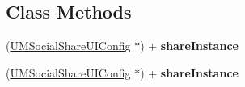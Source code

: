 \subsection*{Class Methods}
\begin{DoxyCompactItemize}
\item 
\mbox{\label{interface_u_m_social_share_u_i_config_a7a5845062aa4501a0c4d19be4379eea3}} 
(\mbox{\hyperlink{interface_u_m_social_share_u_i_config}{U\+M\+Social\+Share\+U\+I\+Config}} $\ast$) + {\bfseries share\+Instance}
\item 
\mbox{\label{interface_u_m_social_share_u_i_config_a7a5845062aa4501a0c4d19be4379eea3}} 
(\mbox{\hyperlink{interface_u_m_social_share_u_i_config}{U\+M\+Social\+Share\+U\+I\+Config}} $\ast$) + {\bfseries share\+Instance}
\end{DoxyCompactItemize}
